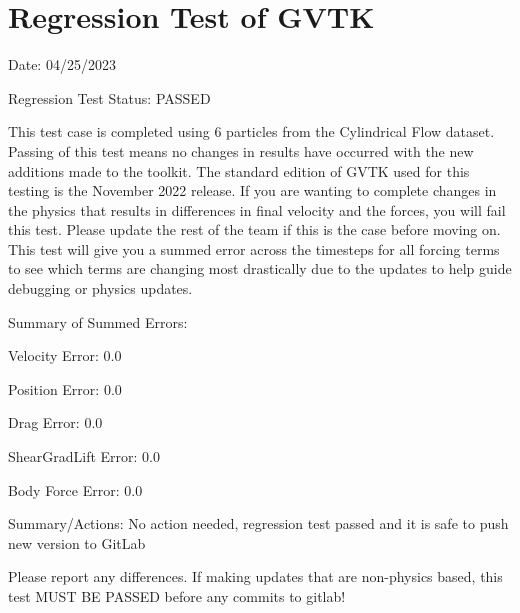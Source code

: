 \documentclass{article}
\begin{document}
\section{Regression Test of GVTK}
Date: 04/25/2023

\vspace{5pt}

\noindent Regression Test Status: PASSED

\vspace{5pt}

\noindent This test case is completed using 6 particles from the Cylindrical Flow dataset. Passing of this test means no changes in results have occurred with the new additions made to the toolkit.
The standard edition of GVTK used for this testing is the November 2022 release. If you are wanting to complete changes in the physics that results in differences in final velocity and the forces,
you will fail this test. Please update the rest of the team if this is the case before moving on. This test will give you a summed error across the timesteps for all forcing terms to see which terms
are changing most drastically due to the updates to help guide debugging or physics updates.



\vspace{5pt}

\noindent Summary of Summed Errors:
\vspace{5pt}

Velocity Error: 0.0

Position Error: 0.0

Drag Error: 0.0

ShearGradLift Error: 0.0

Body Force Error: 0.0

\vspace{5pt}

\noindent Summary/Actions: No action needed, regression test passed and it is safe to push new version to GitLab

\vspace{5pt}

\noindent Please report any differences. If making updates that are non-physics based, this test MUST BE PASSED before any commits to gitlab!
\end{document}
